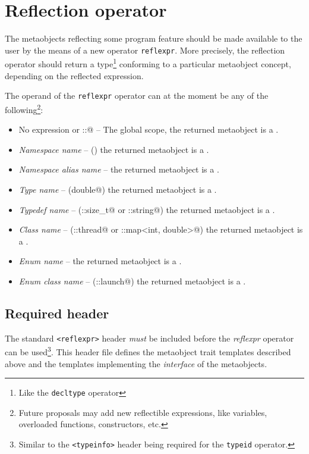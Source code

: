 \section{Reflection operator}
\label{section-reflection-operator}

The metaobjects reflecting some program feature \verb@X@ 
should be made available to the user by
the means of a new operator \texttt{reflexpr}.
More precisely, the reflection operator should return
a type\footnote{Like the \texttt{decltype} operator} conforming to a particular
metaobject concept, depending on the reflected expression.

The operand \verb@X@ of the \texttt{reflexpr} operator can at the moment
be any of the following\footnote{Future proposals may add new reflectible expressions,
like variables, overloaded functions, constructors, etc.}:

\begin{itemize}
\item{No expression or \verb@::@} -- The global scope, the returned metaobject is a {}.
\item{{\em Namespace name}} -- (\verb@std@) the returned metaobject is a {}.
\item{{\em Namespace alias name}} -- the returned metaobject is a {}.
\item{{\em Type name}} -- (\verb@long double@) the returned metaobject is a {}.
\item{{\em Typedef name}} -- (\verb@std::size_t@ or \verb@std::string@)
     the returned metaobject is a {}.
\item{{\em Class name}} -- (\verb@std::thread@ or \verb@std::map<int, double>@)
     the returned metaobject is a {}.
\item{{\em Enum name}} -- 
     the returned metaobject is a {}.
\item{{\em Enum class name}} -- (\verb@std::launch@)
     the returned metaobject is a {}.
\end{itemize}

\subsection{Required header}
\label{section-reflexpr-header}

The standard \texttt{<reflexpr>} header \emph{must} be included before
the \emph{reflexpr} operator can be used\footnote{Similar to the
\texttt{<typeinfo>} header being required for the \texttt{typeid} operator.}.
This header file defines the metaobject trait templates described above
and the templates implementing the \emph{interface} of the metaobjects.
